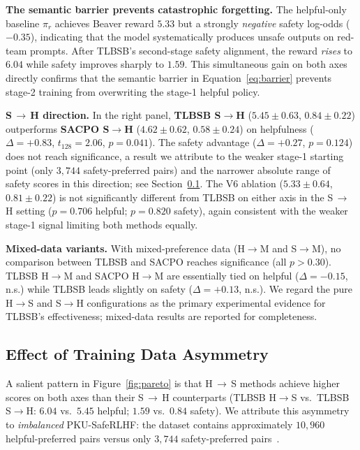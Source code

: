 \textbf{The semantic barrier prevents catastrophic forgetting.}
%
The helpful-only baseline $\pi_r$ achieves Beaver reward $5.33$ but a
strongly \emph{negative} safety log-odds ($-0.35$), indicating that the
model systematically produces unsafe outputs on red-team prompts.
After TLBSB's second-stage safety alignment,
the reward \emph{rises} to $6.04$ while safety improves sharply to $1.59$.
This simultaneous gain on both axes directly confirms that
the semantic barrier in Equation~\eqref{eq:barrier} prevents stage-2
training from overwriting the stage-1 helpful policy.

\textbf{S$\,\to\,$H direction.}
%
In the right panel, \textbf{TLBSB S$\to$H} ($5.45 \pm 0.63$, $0.84 \pm 0.22$)
outperforms \textbf{SACPO S$\to$H} ($4.62 \pm 0.62$, $0.58 \pm 0.24$)
on helpfulness ($\Delta = +0.83$, $t_{128}=2.06$, $p=0.041$).
The safety advantage ($\Delta = +0.27$, $p=0.124$) does not reach significance,
a result we attribute to the weaker stage-1 starting point (only $3{,}744$
safety-preferred pairs) and the narrower absolute range of safety scores in
this direction; see Section~\ref{sec:data-asymmetry}.
The V6 ablation ($5.33 \pm 0.64$, $0.81 \pm 0.22$) is
not significantly different from TLBSB on either axis in the S$\,\to\,$H
setting ($p=0.706$ helpful; $p=0.820$ safety), again consistent with the
weaker stage-1 signal limiting both methods equally.

\textbf{Mixed-data variants.}
%
With mixed-preference data (H$\to$M and S$\to$M),
no comparison between TLBSB and SACPO reaches significance
(all $p > 0.30$).
TLBSB H$\to$M and SACPO H$\to$M are essentially tied on helpful
($\Delta=-0.15$, n.s.) while TLBSB leads slightly on safety ($\Delta=+0.13$, n.s.).
We regard the pure H$\to$S and S$\to$H configurations as the primary
experimental evidence for TLBSB's effectiveness; mixed-data results are
reported for completeness.


\subsection{Effect of Training Data Asymmetry}
\label{sec:data-asymmetry}

A salient pattern in Figure~\ref{fig:pareto} is that H$\,\to\,$S methods
achieve higher scores on both axes than their S$\,\to\,$H counterparts
(TLBSB H$\to$S vs.\ TLBSB S$\to$H: $6.04$ vs.\ $5.45$ helpful;
$1.59$ vs.\ $0.84$ safety).
We attribute this asymmetry to \emph{imbalanced} PKU-SafeRLHF:
the dataset contains approximately $10{,}960$ helpful-preferred pairs versus
only $3{,}744$ safety-preferred pairs~\citep{ji2024beavertails}.


